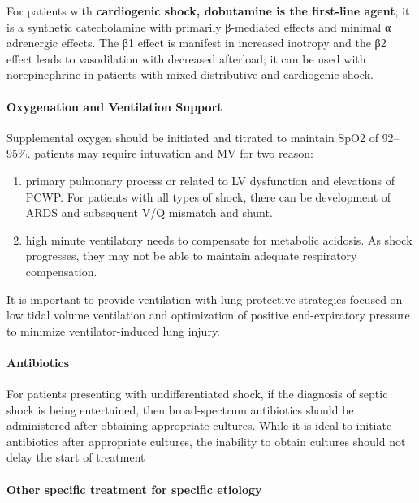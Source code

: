 \documentclass[
  letterpaper,
  DIV=11,
  numbers=noendperiod]{scrreprt}
\let\oldparagraph\paragraph
\renewcommand{\paragraph}[1]{\oldparagraph{#1}\mbox{}}
\begin{document}
For patients with \textbf{cardiogenic shock, dobutamine is the
first-line agent}; it is a synthetic catecholamine with primarily
β-mediated effects and minimal α adrenergic effects. The β1 effect is
manifest in increased inotropy and the β2 effect leads to vasodilation
with decreased afterload; it can be used with norepinephrine in patients
with mixed distributive and cardiogenic shock.

\paragraph{Oxygenation and Ventilation
Support}\label{oxygenation-and-ventilation-support}

Supplemental oxygen should be initiated and titrated to maintain SpO2 of
92--95\%. patients may require intuvation and MV for two reason:

\begin{enumerate}
\def\labelenumi{\arabic{enumi}.}
\item
  primary pulmonary process or related to LV dysfunction and elevations
  of PCWP. For patients with all types of shock, there can be
  development of ARDS and subsequent V/Q mismatch and shunt.
\item
  high minute ventilatory needs to compensate for metabolic acidosis. As
  shock progresses, they may not be able to maintain adequate
  respiratory compensation.
\end{enumerate}

It is important to provide ventilation with lung-protective strategies
focused on low tidal volume ventilation and optimization of positive
end-expiratory pressure to minimize ventilator-induced lung injury.

\paragraph{Antibiotics}\label{antibiotics}

For patients presenting with undifferentiated shock, if the diagnosis of
septic shock is being entertained, then broad-spectrum antibiotics
should be administered after obtaining appropriate cultures. While it is
ideal to initiate antibiotics after appropriate cultures, the inability
to obtain cultures should not delay the start of treatment

\paragraph{Other specific treatment for specific
etiology}\label{other-specific-treatment-for-specific-etiology}
\end{document}
